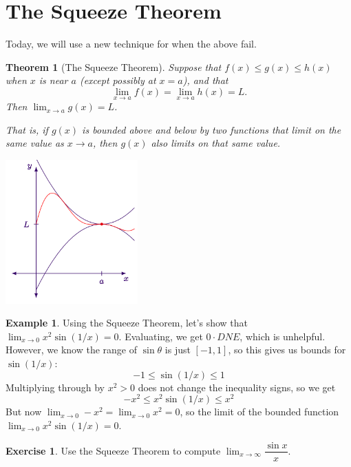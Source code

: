 \documentclass[11pt,reqno,final]{amsart}
\numberwithin{figure}{section}
\newtheorem{theorem}[equation]{Theorem}%
\theoremstyle{definition} %
\newtheorem{example}[equation]{Example}%
\newtheorem{exercise}[question]{Exercise}
\newcommand{\dlim}{\displaystyle\lim}
\begin{document}
\section{The Squeeze Theorem}

Today, we will use a new technique for when the above fail.

\begin{theorem}[The Squeeze Theorem]
        Suppose that $f(x) \leq g(x) \leq h(x)$ when $x$ is near $a$ (except possibly at $x=a$),
        and that
        \[
                \dlim_{x \to a} f(x) = \lim_{x \to a} h(x) = L.
        \]
        Then $\dlim_{x \to a} g(x) = L$.
\end{theorem}
\textit{That is, if $g(x)$ is bounded above and below by two functions that limit on the same value as $x \to a$, then
  $g(x)$ also limits on that same value.}

\begin{center}
        \includegraphics[width=2in]{10-02P_squeeze.png}
\end{center}

\newpage

\begin{example}
        Using the Squeeze Theorem, let's show that $\dlim_{x \to 0} x^2 \sin(1/x) = 0$.
        Evaluating, we get $0 \cdot DNE$, which is unhelpful.
        However, we know the range of $\sin \theta$ is just $[-1,1]$, so this gives us bounds for $\sin(1/x)$: 
        \[
                -1 \leq \sin(1/x) \leq 1
        \]
        Multiplying through by $x^2>0$ does not change the inequality signs, so we get
        \[
                -x^2 \leq x^2 \sin(1/x) \leq x^2 
        \]
        But now $\dlim_{x \to 0} -x^2 = \dlim_{x \to 0} x^2 = 0$, so the limit of the bounded function
        $\dlim_{x \to 0} x^2 \sin(1/x) = 0$.        
\end{example}

\begin{exercise}
        Use the Squeeze Theorem to compute $\dlim_{x \to \infty} \dfrac{\sin x}{x}$.
        \vfill
\end{exercise}
\end{document}
